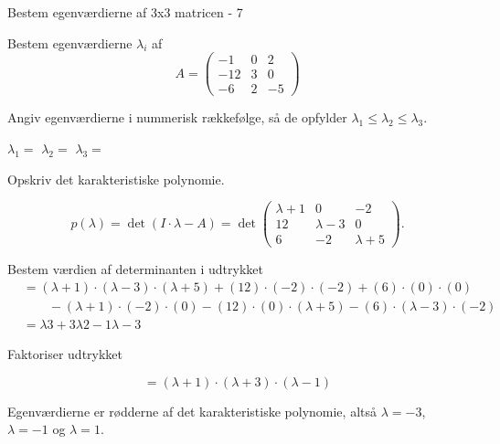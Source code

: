 \documentclass{article}
\begin{document}
\begin{exercise}{Bestem egenværdierne af 3x3 matricen - 7}

Bestem egenværdierne $\lambda_i$ af 
\[
A=\begin{pmatrix}
-1 & 0 & 2 \\
-12 & 3 & 0 \\
-6 & 2 & -5
\end{pmatrix}
\]

Angiv egenværdierne i nummerisk rækkefølge, så de
opfylder $\lambda_1 \le \lambda_2 \le \lambda_3$.

$\lambda_1 = $
$\lambda_2 = $
$\lambda_3 = $

\hint
Opskriv det karakteristiske polynomie.

\hint
\[
p(\lambda)=\det\left(I \cdot \lambda - A \right)=\det\begin{pmatrix}
\lambda + 1 & 0 & -2 \\
12 & \lambda - 3 & 0 \\
6 & -2 & \lambda + 5
\end{pmatrix}.
\]

\hint
Bestem værdien af determinanten i udtrykket
\begin{align*}
& =(\lambda+1) \cdot (\lambda-3) \cdot (\lambda+5)+(12) \cdot (-2) \cdot (-2)+(6) \cdot (0) \cdot (0) \\
& \qquad -(\lambda+1) \cdot (-2) \cdot (0)-(12) \cdot (0) \cdot (\lambda+5)-(6) \cdot (\lambda-3) \cdot (-2) \\
& =\lambda3+3\lambda2-1\lambda-3
\end{align*}

\hint
Faktoriser udtrykket

\hint
\[
=(\lambda+1) \cdot (\lambda+3) \cdot (\lambda-1)
\]

\hint
Egenværdierne er rødderne af det karakteristiske polynomie, 
altså
$\lambda=-3$, $\lambda=-1$ og $\lambda=1$.

\end{exercise}
\end{document}
